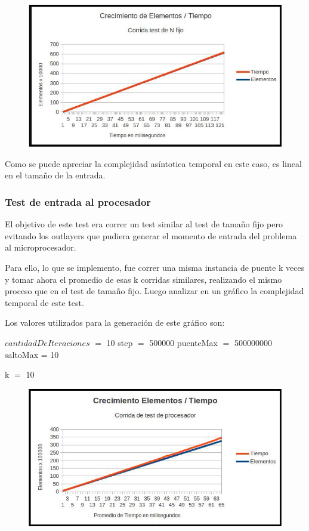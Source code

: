 \begin{figure}[ht]
	\begin{minipage}[t]{\linewidth}
		\centering
		\includegraphics[width=\textwidth]{grafico_de_n_fijo.jpg}
	\end{minipage}	
\end{figure}

Como se puede apreciar la complejidad as\'intotica temporal en este caso, es lineal en el tamaño de la entrada.


\newpage
\subsubsection{Test de entrada al procesador}

El objetivo de este test era correr un test similar al test de tamaño fijo pero evitando los outlayers que pudiera generar el momento de entrada del problema al microprocesador. 

Para ello, lo que se implemento, fue correr una misma instancia de puente k veces y tomar ahora el promedio de esas k corridas similares, realizando el mismo proceso que en el test de tamaño fijo. Luego analizar en un gr\'afico la complejidad temporal de este test.

Los valores utilizados para la generaci\'on de este gr\'afico son:

$cantidadDeIteraciones$ $=$ 10 step $=$ 500000 puenteMax $=$ 500000000 saltoMax = 10 

k $=$ 10


\begin{figure}[ht]
	\begin{minipage}[t]{\linewidth}
		\centering
		\includegraphics[width=\textwidth]{grafico_de_entrada_al_procesador.jpg}
	\end{minipage}	
\end{figure}

